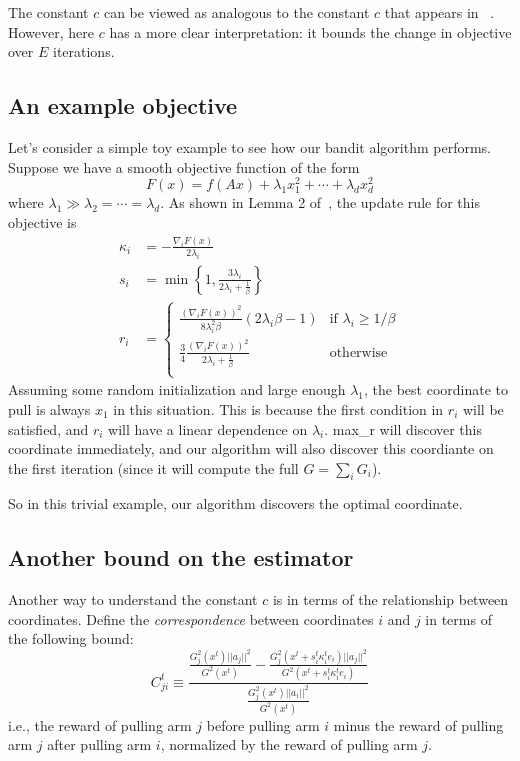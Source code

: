 \documentclass[letterpaper]{article}
\begin{document}
The constant $c$ can be viewed as analogous to the constant $c$ that appears in ~\cite{salehi2018coordinate}. However, here $c$ has a more clear interpretation: it bounds the change in objective over $E$ iterations.

\subsection{An example objective}
Let's consider a simple toy example to see how our bandit algorithm performs. Suppose we have a smooth objective function of the form
\begin{equation}
    F(x) = f(Ax) + \lambda_1 x_1^2 + \cdots + \lambda_d x_d^2
\end{equation}
where $\lambda_1 \gg \lambda_2 = \cdots = \lambda_d$. As shown in Lemma 2 of~\cite{salehi2018coordinate}, the update rule for this objective is
\begin{align*}
    \kappa_i &= -\frac{\nabla_i F(x)}{2\lambda_i} \\ 
    s_i &= \min\left\{1, \frac{3\lambda_i}{2\lambda_i + \frac{1}{\beta}}\right\} \\
    r_i &= \begin{cases}
        \frac{(\nabla_i F(x))^2}{8\lambda_i^2 \beta}(2\lambda_i \beta - 1) & \text{if }\lambda_i \geq 1/\beta \\
        \frac{3}{4}\frac{(\nabla_i F(x))^2}{2\lambda_i + \frac{1}{\beta}} & \text{otherwise} \\
    \end{cases}
\end{align*}
Assuming some random initialization and large enough $\lambda_1$, the best coordinate to pull is always $x_1$ in this situation. This is because the first condition in $r_i$ will be satisfied, and $r_i$ will have a linear dependence on $\lambda_i$. max\_r will discover this coordinate immediately, and our algorithm will also discover this coordiante on the first iteration (since it will compute the full $G = \sum_i G_i$).

So in this trivial example, our algorithm discovers the optimal coordinate.

\subsection{Another bound on the estimator}
Another way to understand the constant $c$ is in terms of the relationship between coordinates. Define the \emph{correspondence} between coordinates $i$ and $j$ in terms of the following bound:
\begin{equation}
    C_{ji}^t \equiv \frac{\frac{G_j^2(x^t) ||a_j||^2}{G^2(x^t)} - \frac{G_j^2(x^t + s_i^t \kappa_i^t e_i) ||a_j||^2}{G^2(x^t + s_i^t \kappa_i^t e_i)}}{\frac{G_j^2(x^t) ||a_i||^2}{G^2(x^t)}}
\end{equation}
i.e., the reward of pulling arm $j$ before pulling arm $i$ minus the reward of pulling arm $j$ after pulling arm $i$, normalized by the reward of pulling arm $j$.
\end{document}
